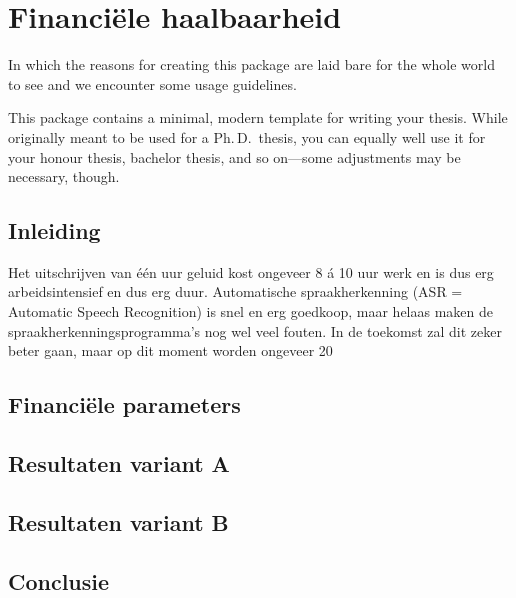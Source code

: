 \chapter{Financiële haalbaarheid}

\begin{center}
  \begin{minipage}{0.5\textwidth}
    \begin{small}
      In which the reasons for creating this package are laid bare for the
      whole world to see and we encounter some usage guidelines.
    \end{small}
  \end{minipage}
  \vspace{0.5cm}
\end{center}

\noindent This package contains a minimal, modern template for writing your
thesis. While originally meant to be used for a Ph.\,D.\ thesis, you can
equally well use it for your honour thesis, bachelor thesis, and so
on---some adjustments may be necessary, though.

\section{Inleiding}
Het uitschrijven van één uur geluid kost ongeveer 8 á 10 uur werk en is dus erg arbeidsintensief en dus erg duur. Automatische spraakherkenning (ASR = Automatic Speech Recognition) is snel en erg goedkoop, maar helaas maken de spraakherkenningsprogramma’s nog wel veel fouten. In de toekomst zal dit zeker beter gaan, maar op dit moment worden ongeveer 20%

\section{Financiële parameters}


\section{Resultaten variant A}


\section{Resultaten variant B}


\section{Conclusie}